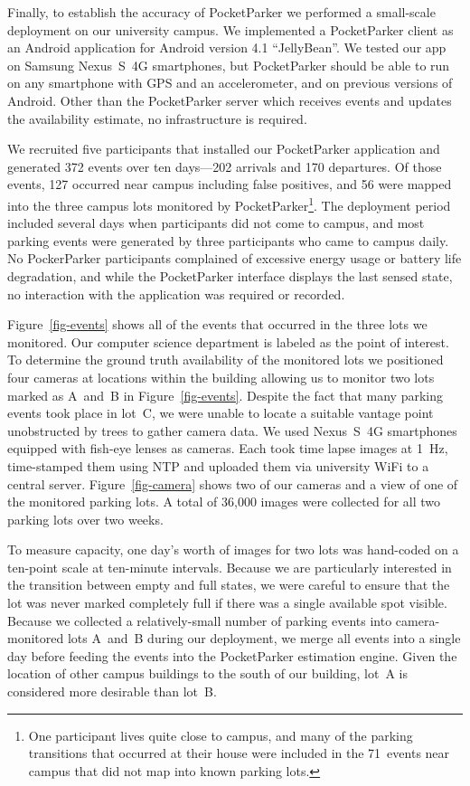 Finally, to establish the accuracy of PocketParker we performed a small-scale
deployment on our university campus. We implemented a PocketParker client as
an Android application for Android version 4.1 ``JellyBean''. We tested our
app on Samsung Nexus~S~4G smartphones, but PocketParker should be able to run
on any smartphone with GPS and an accelerometer, and on previous versions of
Android. Other than the PocketParker server which receives events and updates
the availability estimate, no infrastructure is required.

We recruited five participants that installed our PocketParker application
and generated 372 events over ten days---202 arrivals and 170 departures. Of
those events, 127 occurred near campus including false positives, and 56 were
mapped into the three campus lots monitored by PocketParker\footnote{One
participant lives quite close to campus, and many of the parking transitions
that occurred at their house were included in the 71~events near campus that
did not map into known parking lots.}. The deployment period included several
days when participants did not come to campus, and most parking events were
generated by three participants who came to campus daily. No PockerParker
participants complained of excessive energy usage or battery life
degradation, and while the PocketParker interface displays the last sensed
state, no interaction with the application was required or recorded.

Figure~\ref{fig-events} shows all of the events that occurred in the three
lots we monitored. Our computer science department is labeled as the point of
interest. To determine the ground truth availability of the monitored lots we
positioned four cameras at locations within the building allowing us to
monitor two lots marked as A~and~B in Figure~\ref{fig-events}. Despite the
fact that many parking events took place in lot~C, we were unable to locate a
suitable vantage point unobstructed by trees to gather camera data. We used
Nexus~S~4G smartphones equipped with fish-eye lenses as cameras. Each took
time lapse images at 1~Hz, time-stamped them using NTP and uploaded them via
university WiFi to a central server. Figure~\ref{fig-camera} shows two of our
cameras and a view of one of the monitored parking lots. A total of 36,000
images were collected for all two parking lots over two weeks.

To measure capacity, one day's worth of images for two lots was hand-coded on
a ten-point scale at ten-minute intervals. Because we are particularly
interested in the transition between empty and full states, we were careful
to ensure that the lot was never marked completely full if there was a single
available spot visible. Because we collected a relatively-small number of
parking events into camera-monitored lots A~and~B during our deployment, we
merge all events into a single day before feeding the events into the
PocketParker estimation engine. Given the location of other campus buildings
to the south of our building, lot~A is considered more desirable than lot~B.

